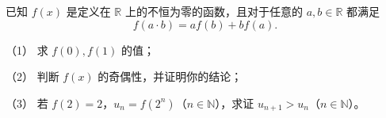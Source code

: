 \begin{question}
已知 \(f(x)\) 是定义在 \(\mathbb R\) 上的不恒为零的函数，且对于任意的 \(a,b\in\mathbb R\) 都满足
\nopagebreak[4]
\[
f(a\cdot b)=a f(b)+b f(a).
\]

（1） 求 \(f(0),f(1)\) 的值；

（2） 判断 \(f(x)\) 的奇偶性，并证明你的结论；

（3） 若 \(f(2)=2\)，\(u_n=f(2^n)\)（\(n\in\mathbb N\)），求证 \(u_{n+1}>u_n\)（\(n\in\mathbb N\)）。

\end{question}